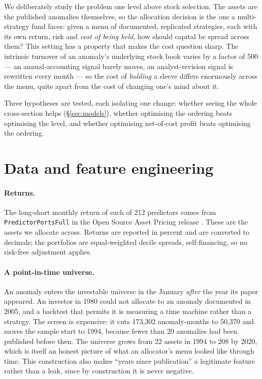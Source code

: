 \documentclass[11pt,a4paper]{article}
\begin{document}
We deliberately study the problem one level above stock selection. The assets are
the published anomalies themselves, so the allocation decision is the one a
multi-strategy fund faces: given a menu of documented, replicated strategies, each
with its own return, risk and \emph{cost of being held}, how should capital be
spread across them? This setting has a property that makes the cost question
sharp. The intrinsic turnover of an anomaly's underlying stock book varies by a
factor of 500 --- an annual-accounting signal barely moves, an
analyst-revision signal is rewritten every month --- so the cost of \emph{holding}
a sleeve differs enormously across the menu, quite apart from the cost of changing
one's mind about it.

Three hypotheses are tested, each isolating one change: whether seeing the whole
cross-section helps (\S\ref{sec:models}), whether optimising the ordering beats
optimising the level, and whether optimising net-of-cost profit beats optimising
the ordering.

\section{Data and feature engineering}

\paragraph{Returns.} The long-short monthly return of each of 212 predictors comes
from \texttt{PredictorPortsFull} in the Open Source Asset Pricing release
\citep{ChenZimmermann2022}. These are the assets we allocate across. Returns are
reported in percent and are converted to decimals; the portfolios are
equal-weighted decile spreads, self-financing, so no risk-free adjustment applies.

\paragraph{A point-in-time universe.} An anomaly enters the investable universe in
the January \emph{after} the year its paper appeared. An investor in 1980 could
not allocate to an anomaly documented in 2005, and a backtest that permits it is
measuring a time machine rather than a strategy. The screen is expensive: it cuts
173{,}302 anomaly-months to 50{,}370 and moves the sample start to 1994, because
fewer than 20 anomalies had been published before then. The universe grows from 22
assets in 1994 to 208 by 2020, which is itself an honest picture of what an
allocator's menu looked like through time. This construction also makes ``years
since publication'' a legitimate feature rather than a leak, since by construction
it is never negative.
\end{document}
